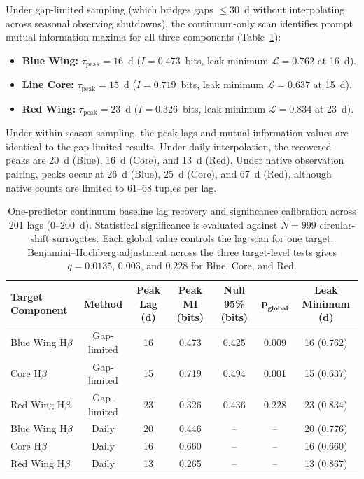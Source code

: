 \documentclass[fleqn,usenatbib]{mnras}
\begin{document}
Under gap-limited sampling (which bridges gaps $\le 30$~d without interpolating across seasonal observing shutdowns), the continuum-only scan identifies prompt mutual information maxima for all three components (Table~\ref{tab:continuum_baseline}):
\begin{itemize}
    \item \textbf{Blue Wing:} $\tau_{\mathrm{peak}} = 16$~d ($I = 0.473$~bits, leak minimum $\mathcal{L} = 0.762$ at 16~d).
    \item \textbf{Line Core:} $\tau_{\mathrm{peak}} = 15$~d ($I = 0.719$~bits, leak minimum $\mathcal{L} = 0.637$ at 15~d).
    \item \textbf{Red Wing:} $\tau_{\mathrm{peak}} = 23$~d ($I = 0.326$~bits, leak minimum $\mathcal{L} = 0.834$ at 23~d).
\end{itemize}
Under within-season sampling, the peak lags and mutual information values are identical to the gap-limited results. Under daily interpolation, the recovered peaks are 20~d (Blue), 16~d (Core), and 13~d (Red). Under native observation pairing, peaks occur at 26~d (Blue), 25~d (Core), and 67~d (Red), although native counts are limited to 61--68 tuples per lag.

\begin{table}
\centering
\begin{tabular}{lcccccc}
\hline
\textbf{Target Component} & \textbf{Method} & \textbf{Peak Lag (d)} & \textbf{Peak MI (bits)} & \textbf{Null 95\% (bits)} & $\boldsymbol{p}_{\mathbf{global}}$ & \textbf{Leak Minimum (d)} \\
\hline
Blue Wing H\(\beta\) & Gap-limited & 16 & 0.473 & 0.425 & 0.009 & 16 (0.762) \\
Core H\(\beta\)      & Gap-limited & 15 & 0.719 & 0.494 & 0.001 & 15 (0.637) \\
Red Wing H\(\beta\)  & Gap-limited & 23 & 0.326 & 0.436 & 0.228 & 23 (0.834) \\
\hline
Blue Wing H\(\beta\) & Daily       & 20 & 0.446 & --    & --     & 20 (0.776) \\
Core H\(\beta\)      & Daily       & 16 & 0.660 & --    & --     & 16 (0.660) \\
Red Wing H\(\beta\)  & Daily       & 13 & 0.265 & --    & --     & 13 (0.867) \\
\hline
\end{tabular}
\caption{One-predictor continuum baseline lag recovery and significance calibration across 201 lags ($0$--$200$~d). Statistical significance is evaluated against $N=999$ circular-shift surrogates. Each global value controls the lag scan for one target. Benjamini--Hochberg adjustment across the three target-level tests gives $q=0.0135$, $0.003$, and $0.228$ for Blue, Core, and Red.}
\label{tab:continuum_baseline}
\end{table}
\end{document}
